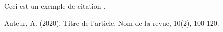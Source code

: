 \documentclass{article}
\begin{document}
Ceci est un exemple de citation \cite{exemple1}.

\begin{thebibliography}{9}

Auteur, A. (2020). Titre de l'article. Nom de la revue, 10(2), 100-120.

\end{thebibliography}
\end{document}
